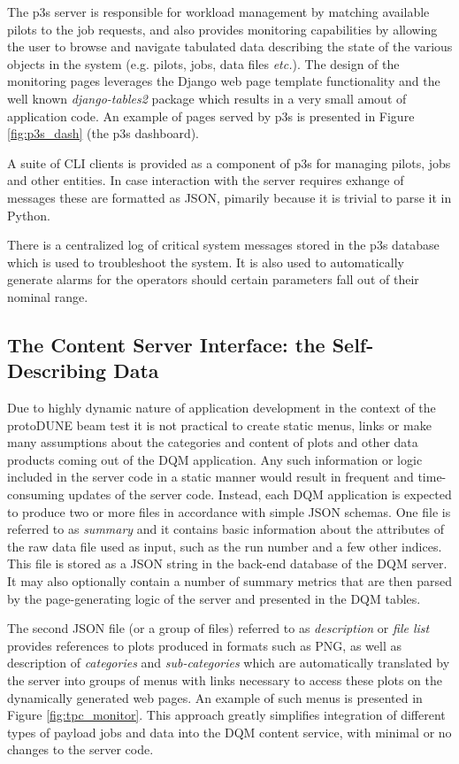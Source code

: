 \documentclass[pdftex,12pt,letter]{article}
\newcommand{\pd}{protoDUNE\xspace}
\begin{document}
The p3s server is responsible for workload management by matching available pilots to the job requests,
and also provides monitoring capabilities by allowing the user to browse and navigate
tabulated data describing the state of the various objects in the system (e.g. pilots, jobs, data files \textit{etc.}).
The design of the monitoring pages leverages the Django web page template functionality and
the well known \textit{django-tables2} package which results
in a very small amout of application code. An example of pages served by p3s is
presented in Figure \ref{fig:p3s_dash} (the p3s dashboard).


 A suite of CLI clients is provided as a component of p3s for managing pilots, jobs and
other entities. In case interaction with the server requires exhange of messages these are
formatted as JSON, pimarily because it is trivial to parse it in Python.

There is a centralized log of critical system messages stored in the p3s database which
is used to troubleshoot the system. It is also used to automatically generate alarms
for the operators should certain parameters fall out of their nominal range.

\subsection{The Content Server Interface: the Self-Describing Data}
Due to highly dynamic nature of application development in the context of the \pd beam
test it is not practical to create static menus, links or make many assumptions about
the categories and content of plots and other data products coming out of the DQM
application. Any such information or logic included in the server code in a static manner
would result in frequent and time-consuming updates of the server code. Instead,
each DQM application is expected to produce two or more files in accordance
with simple JSON schemas. One file is referred to as \textit{summary} and it contains basic
information about the attributes of the raw data file used as input, such as the run number
and a few other indices. This file is stored as a JSON string in the back-end database
of the DQM server. It may also optionally contain a number of summary metrics
that are then parsed by the page-generating logic of the server and presented
in the DQM tables.

The second JSON file (or a group of files) referred to as \textit{description} or \textit{file list}
provides references to plots produced in formats such as PNG, as well as description of
\textit{categories} and \textit{sub-categories} which are automatically translated by the server into
groups of menus with links necessary to access these plots on the dynamically generated
web pages. An example of such menus is presented in Figure \ref{fig:tpc_monitor}.
This approach greatly simplifies integration of different types of payload jobs 
and data into the DQM content service, with minimal or no changes to the
server code.
\end{document}
